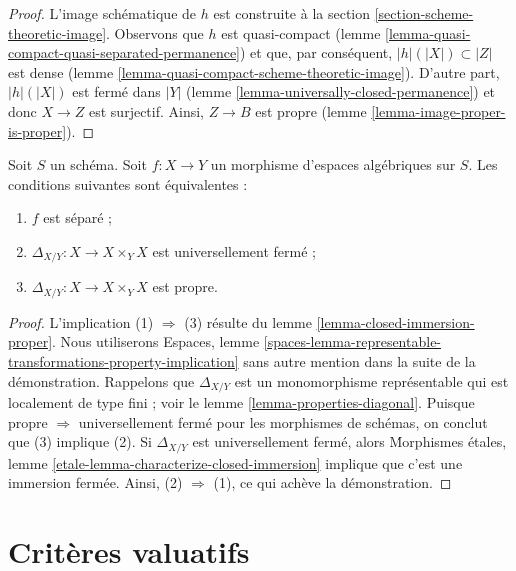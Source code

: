 \begin{proof}
L'image schématique de $h$ est construite à la section
\ref{section-scheme-theoretic-image}.
Observons que $h$ est quasi-compact
(lemme \ref{lemma-quasi-compact-quasi-separated-permanence})
et que, par conséquent, $|h|(|X|) \subset |Z|$
est dense (lemme \ref{lemma-quasi-compact-scheme-theoretic-image}).
D'autre part, $|h|(|X|)$ est fermé dans $|Y|$
(lemme \ref{lemma-universally-closed-permanence})
et donc $X \to Z$ est surjectif.
Ainsi, $Z \to B$ est propre (lemme \ref{lemma-image-proper-is-proper}).
\end{proof}

\begin{lemma}
\label{lemma-separated-diagonal-proper}
Soit $S$ un schéma.
Soit $f : X \to Y$ un morphisme d'espaces algébriques sur $S$.
Les conditions suivantes sont équivalentes :
\begin{enumerate}
\item $f$ est séparé ;
\item $\Delta_{X/Y} : X \to X \times_Y X$ est universellement fermé ;
\item $\Delta_{X/Y} : X \to X \times_Y X$ est propre.
\end{enumerate}
\end{lemma}

\begin{proof}
L'implication (1) $\Rightarrow$ (3) résulte du
lemme \ref{lemma-closed-immersion-proper}.
Nous utiliserons
Espaces, lemme
\ref{spaces-lemma-representable-transformations-property-implication}
sans autre mention dans la suite de la démonstration.
Rappelons que $\Delta_{X/Y}$ est un monomorphisme
représentable qui est localement de type fini ; voir le
lemme \ref{lemma-properties-diagonal}.
Puisque propre $\Rightarrow$ universellement fermé pour les morphismes de schémas,
on conclut que (3) implique (2).
Si $\Delta_{X/Y}$ est universellement fermé, alors
\'Morphismes étales,
lemme \ref{etale-lemma-characterize-closed-immersion}
implique que c'est une immersion fermée. Ainsi, (2) $\Rightarrow$ (1),
ce qui achève la démonstration.
\end{proof}





\section{Critères valuatifs}
\label{section-valuative}

